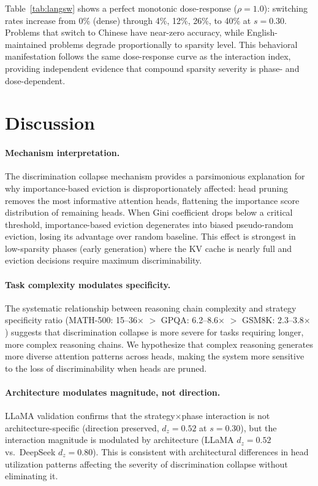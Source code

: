 \documentclass[11pt,a4paper]{article}
\begin{document}
Table~\ref{tab:langsw} shows a perfect monotonic dose-response ($\rho=1.0$): switching rates increase from 0\% (dense) through 4\%, 12\%, 26\%, to 40\% at $s=0.30$. Problems that switch to Chinese have near-zero accuracy, while English-maintained problems degrade proportionally to sparsity level. This behavioral manifestation follows the same dose-response curve as the interaction index, providing independent evidence that compound sparsity severity is phase- and dose-dependent.

\section{Discussion}

\paragraph{Mechanism interpretation.} The discrimination collapse mechanism provides a parsimonious explanation for why importance-based eviction is disproportionately affected: head pruning removes the most informative attention heads, flattening the importance score distribution of remaining heads. When Gini coefficient drops below a critical threshold, importance-based eviction degenerates into biased pseudo-random eviction, losing its advantage over random baseline. This effect is strongest in low-sparsity phases (early generation) where the KV cache is nearly full and eviction decisions require maximum discriminability.

\paragraph{Task complexity modulates specificity.} The systematic relationship between reasoning chain complexity and strategy specificity ratio (MATH-500: 15--36$\times$ $>$ GPQA: 6.2--8.6$\times$ $>$ GSM8K: 2.3--3.8$\times$) suggests that discrimination collapse is more severe for tasks requiring longer, more complex reasoning chains. We hypothesize that complex reasoning generates more diverse attention patterns across heads, making the system more sensitive to the loss of discriminability when heads are pruned.

\paragraph{Architecture modulates magnitude, not direction.} LLaMA validation confirms that the strategy$\times$phase interaction is not architecture-specific (direction preserved, $d_z=0.52$ at $s=0.30$), but the interaction magnitude is modulated by architecture (LLaMA $d_z=0.52$ vs.\ DeepSeek $d_z=0.80$). This is consistent with architectural differences in head utilization patterns affecting the severity of discrimination collapse without eliminating it.
\end{document}
